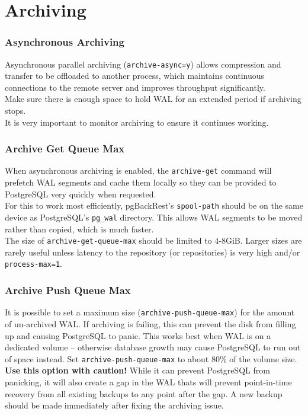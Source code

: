 \section{Archiving}

\begin{frame}[fragile]
    \frametitle{Asynchronous Archiving}

    Asynchronous parallel archiving (\texttt{archive-async=y}) allows compression and transfer to be offloaded to another process, which maintains continuous connections to the remote server and improves throughput significantly.
    \\\vspace{1em}
    Make sure there is enough space to hold WAL for an extended period if archiving stops.
    \\\vspace{1em}
    It is very important to monitor archiving to ensure it continues working.
\end{frame}

\begin{frame}[fragile]
    \frametitle{Archive Get Queue Max}

    When asynchronous archiving is enabled, the \texttt{archive-get} command will prefetch WAL segments and cache them locally so they can be provided to PostgreSQL very quickly when requested.
    \\\vspace{1em}
    For this to work most efficiently, pgBackRest's \texttt{spool-path} should be on the same device as PostgreSQL's \texttt{pg\_wal} directory. This allows WAL segments to be moved rather than copied, which is much faster.
    \\\vspace{1em}
    The size of \texttt{archive-get-queue-max} should be limited to 4-8GiB. Larger sizes are rarely useful unless latency to the repository (or repositories) is very high and/or \texttt{process-max=1}.
\end{frame}

\begin{frame}[fragile]
    \frametitle{Archive Push Queue Max}

    It is possible to set a maximum size (\texttt{archive-push-queue-max}) for the amount of un-archived WAL. If archiving is failing, this can prevent the disk from filling up and causing PostgreSQL to panic. This works best when WAL is on a dedicated volume -- otherwise database growth may cause PostgreSQL to run out of space instead. Set \texttt{archive-push-queue-max} to about 80\% of the volume size.
    \\\vspace{1em}
    \textbf{Use this option with caution!} While it can prevent PostgreSQL from panicking, it will also create a gap in the WAL thats will prevent point-in-time recovery from all existing backups to any point after the gap. A new backup should be made immediately after fixing the archiving issue.
\end{frame}

